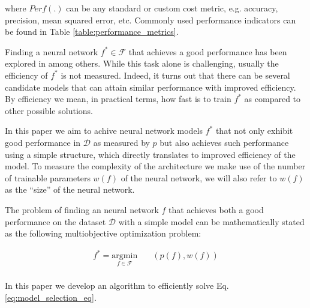 \documentclass[journal]{IEEEtran}
\begin{document}
where $Perf(.)$ can be any standard or custom cost metric, e.g. accuracy, precision, mean squared error, etc.  Commonly used performance indicators can be found in Table \ref{table:performance_metrics}. 

Finding a neural network $f^* \in \mathcal{F}$ that achieves a good performance has been explored in \cite{Jin2018, Real2018} among others. While this task alone is challenging, usually the efficiency of $f^*$ is not measured. Indeed, it turns out that there can be several candidate models that can attain similar performance with improved efficiency. By efficiency we mean, in practical terms, how fast is to train $f^*$ as compared to other possible solutions. 

In this paper we aim to achive neural network models $f^*$ that not only exhibit good performance in $\mathcal{D}$ as measured by $p$ but also achieves such performance using a simple structure, which directly translates to improved efficiency of the model. To measure the complexity of the architecture we make use of the number of trainable parameters $w(f)$ of the neural network, we will also refer to $w(f)$ as the ``size'' of the neural network.

The problem of finding an neural network $f$ that achieves both a good performance on the dataset $\mathcal{D}$ with a simple model can be mathematically stated as the following multiobjective optimization problem:

\begin{equation}
	\begin{aligned}
	f^* = \underset{f \in \mathcal{F}}{\text{argmin}}
	& \quad (p(f), w(f))\\
	\end{aligned}
	\label{eq:model_selection_eq}
\end{equation}

In this paper we develop an algorithm to efficiently solve Eq. \ref{eq:model_selection_eq}.
\end{document}
